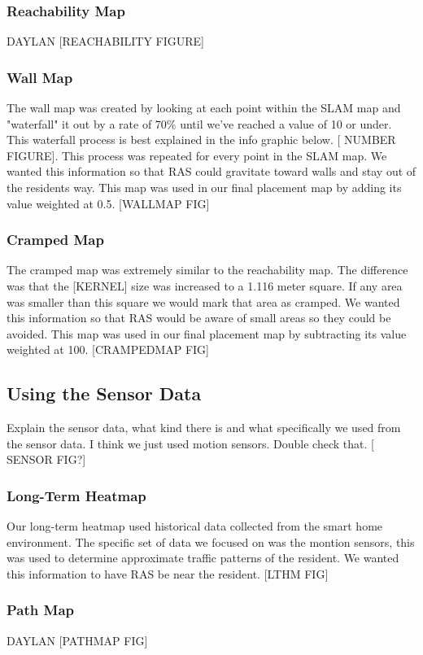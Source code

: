 \documentclass[11pt, draft, a4paper]{IEEEtran}
\begin{document}
\subsubsection{Reachability Map}
DAYLAN
[REACHABILITY FIGURE]


\subsubsection{Wall Map}
The wall map was created by looking at each point within the SLAM map and 
"waterfall" it out by a rate of 70\% until we've reached a value of 10 or 
under. This waterfall process is best explained in the info graphic below. [
NUMBER FIGURE]. This process was repeated for every point in the SLAM map. We 
wanted this information so that RAS could gravitate toward walls and stay out 
of the residents way. This map was used in our final placement map by adding 
its value weighted at 0.5. [WALLMAP FIG]


\subsubsection{Cramped Map}
The cramped map was extremely similar to the reachability map. The difference 
was that the [KERNEL] size was increased to a 1.116 meter square. If any area 
was smaller than this square we would mark that area as cramped. We wanted 
this information so that RAS would be aware of small areas so they could be 
avoided. This map was used in our final placement map by subtracting its value 
weighted at 100. [CRAMPEDMAP FIG]


\subsection{Using the Sensor Data}
Explain the sensor data, what kind there is and what specifically we used from 
the sensor data. I think we just used motion sensors. Double check that. [
SENSOR FIG?]


\subsubsection{Long-Term Heatmap}
Our long-term heatmap used historical data collected from the smart home 
environment. The specific set of data we focused on was the montion sensors, 
this was used to determine approximate traffic patterns of the resident. We 
wanted this information to have RAS be near the resident. [LTHM FIG]


\subsubsection{Path Map}
DAYLAN
[PATHMAP FIG]
\end{document}
